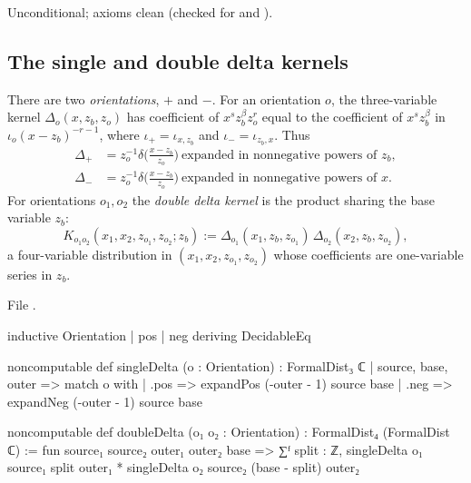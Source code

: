 \begin{status}
Unconditional; axioms clean (checked for  and ).
\end{status}

\subsection{The single and double delta kernels}

\begin{definition}\label{l01:def:singledelta}
There are two \emph{orientations}, $+$ and $-$. For an orientation $o$, the three-variable kernel
$\Delta_o(x,z_b,z_o)$ has coefficient of $x^{s}z_b^{\beta}z_o^{r}$ equal to the coefficient of $x^sz_b^\beta$ in
$\iota_o(x-z_b)^{-r-1}$, where $\iota_+ = \iota_{x,z_b}$ and $\iota_- = \iota_{z_b,x}$. Thus
\begin{align*}
  \Delta_+ &= z_o^{-1}\delta\Big(\frac{x-z_b}{z_o}\Big)\ \text{expanded in nonnegative powers of }z_b,\\
  \Delta_- &= z_o^{-1}\delta\Big(\frac{x-z_b}{z_o}\Big)\ \text{expanded in nonnegative powers of }x .
\end{align*}
For orientations $o_1,o_2$ the \emph{double delta kernel} is the product sharing the base variable $z_b$:
\begin{equation*}
  K_{o_1o_2}(x_1,x_2,z_{o_1},z_{o_2};z_b) := \Delta_{o_1}(x_1,z_b,z_{o_1})\,\Delta_{o_2}(x_2,z_b,z_{o_2}),
\end{equation*}
a four-variable distribution in $(x_1,x_2,z_{o_1},z_{o_2})$ whose coefficients are one-variable series in $z_b$.
\end{definition}

\noindent File .
\begin{leancode}
inductive Orientation
  | pos
  | neg
  deriving DecidableEq

noncomputable def singleDelta (o : Orientation) : FormalDist₃ ℂ
  | source, base, outer => match o with
    | .pos => expandPos (-outer - 1) source base
    | .neg => expandNeg (-outer - 1) source base

noncomputable def doubleDelta (o₁ o₂ : Orientation) : FormalDist₄ (FormalDist ℂ) :=
  fun source₁ source₂ outer₁ outer₂ base => ∑ᶠ split : ℤ,
    singleDelta o₁ source₁ split outer₁ *
      singleDelta o₂ source₂ (base - split) outer₂
\end{leancode}

